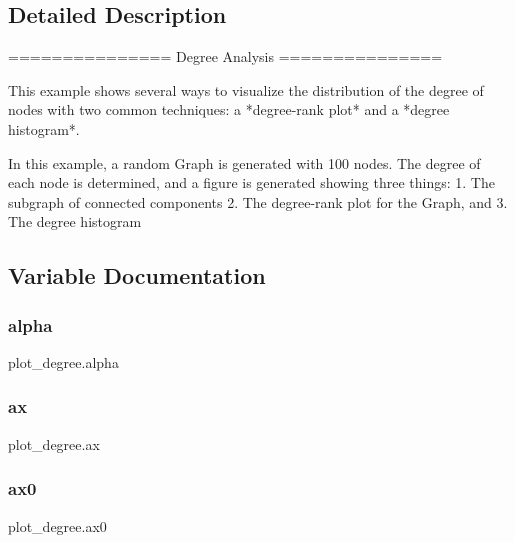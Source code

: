 \subsection{Detailed Description}
\begin{DoxyVerb}===============
Degree Analysis
===============

This example shows several ways to visualize the distribution of the degree of
nodes with two common techniques: a *degree-rank plot* and a
*degree histogram*.

In this example, a random Graph is generated with 100 nodes. The degree of
each node is determined, and a figure is generated showing three things:
1. The subgraph of connected components
2. The degree-rank plot for the Graph, and
3. The degree histogram
\end{DoxyVerb}
 

\subsection{Variable Documentation}
\mbox{\label{namespaceplot__degree_abeb30bee63ad8ad60600248f29b83f5b}} 
\subsubsection{\texorpdfstring{alpha}{alpha}}
{\footnotesize\ttfamily plot\+\_\+degree.\+alpha}

\mbox{\label{namespaceplot__degree_ad11f3c7b28ef685575f950c58c8ca482}} 
\subsubsection{\texorpdfstring{ax}{ax}}
{\footnotesize\ttfamily plot\+\_\+degree.\+ax}

\mbox{\label{namespaceplot__degree_ab037b710cebaf1a876ac90c6e822915e}} 
\subsubsection{\texorpdfstring{ax0}{ax0}}
{\footnotesize\ttfamily plot\+\_\+degree.\+ax0}

